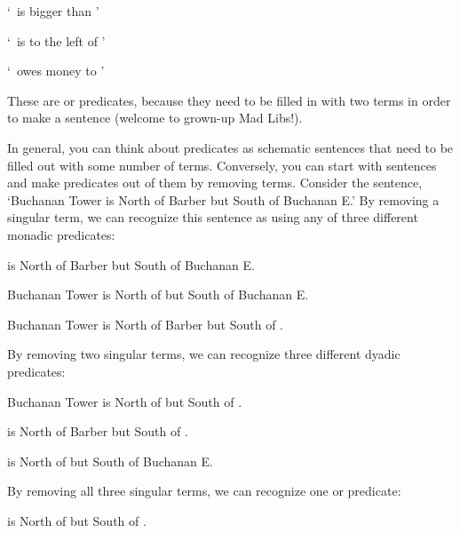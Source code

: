 \begin{earg}
\item[] `\blank\ is bigger than \blank'
\item[] `\blank\ is to the left of \blank'
\item[] `\blank\ owes money to \blank'
\end{earg}

These are  or  predicates, because they need to be filled in with two terms in order to make a sentence {\color{black}(welcome to grown-up Mad Libs!)}. 

In general, you can think about predicates as schematic sentences that need to be filled out with some number of terms. Conversely, you can start with sentences and make predicates out of them by removing terms. Consider the sentence, `Buchanan Tower is North of Barber but South of Buchanan E.' By removing a singular term, we can recognize this sentence as using any of three different monadic predicates:
\begin{earg}
\item[] \blank is North of Barber but South of Buchanan E.\\
\item[] Buchanan Tower is North of \blank but South of Buchanan E.\\
\item[] Buchanan Tower is North of Barber but South of \blank.
\end{earg}

By removing two singular terms, we can recognize three different dyadic predicates:
\begin{earg}
\item[] Buchanan Tower is North of \blank but South of \blank.\\
\item[] \blank is North of Barber but South of \blank.\\
\item[] \blank is North of \blank but South of Buchanan E.\\
\end{earg}

By removing all three singular terms, we can recognize one  or  predicate:
\begin{center}
\item[] \blank is North of \blank but South of \blank.\\
\end{center}

